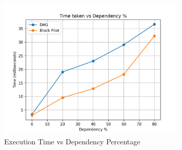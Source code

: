 \documentclass[12pt]{article}
\begin{document}
\begin{figure}[h]
    \centering
    \includegraphics[width=0.8\textwidth]{images/dp_vs_Time.png}
    \caption{Execution Time vs Dependency Percentage}
    \label{fig:dp_vs_Time}
\end{figure}
\end{document}
